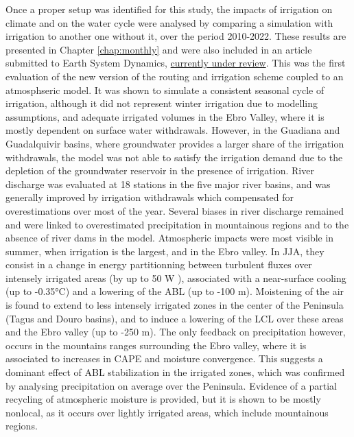 \hfill

Once a proper setup was identified for this study, the impacts of irrigation on climate and on the water cycle were analysed by comparing a simulation with irrigation to another one without it, over the period 2010-2022.
These results are presented in Chapter \ref{chap:monthly} and were also included in an article submitted to Earth System Dynamics, \href{https://egusphere.copernicus.org/preprints/2025/egusphere-2025-2491/}{currently under review}.
This was the first evaluation of the new version of the routing and irrigation scheme coupled to an atmosphseric model. It was shown to simulate a consistent seasonal cycle of irrigation, although it did not represent winter irrigation due to modelling assumptions, and adequate irrigated volumes in the Ebro Valley, where it is mostly dependent on surface water withdrawals. 
However, in the Guadiana and Guadalquivir basins, where groundwater provides a larger share of the irrigation withdrawals, the model was not able to satisfy the irrigation demand due to the depletion of the groundwater reservoir in the presence of irrigation. River discharge was evaluated at 18 stations in the five major river basins, and was generally improved by irrigation withdrawals which compensated for overestimations over most of the year.
Several biases in river discharge remained and were linked to overestimated precipitation in mountainous regions and to the absence of river dams in the model.
Atmospheric impacts were most visible in summer, when irrigation is the largest, and in the Ebro valley. In JJA, they consist in a change in energy partitionning between turbulent fluxes over intensely irrigated areas (by up to 50 W \persqm), associated with a near-surface cooling (up to -0.35°C) and a lowering of the ABL (up to -100 m). Moistening of the air is found to extend to less intensely irrigated zones in the center of the Peninsula (Tagus and Douro basins), and to induce a lowering of the LCL over these areas and the Ebro valley (up to -250 m). The only feedback on precipitation however, occurs in the mountains ranges surrounding the Ebro valley, where it is associated to increases in CAPE and moisture convergence. 
This suggests a dominant effect of ABL stabilization in the irrigated zones, which was confirmed by analysing precipitation on average over the Peninsula. Evidence of a partial recycling of atmospheric moisture is provided, but it is shown to be mostly nonlocal, as it occurs over lightly irrigated areas, which include mountainous regions.


